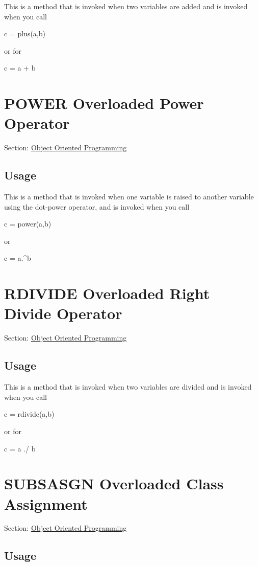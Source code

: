 This is a method that is invoked when two variables are added and is invoked when you call \begin{DoxyVerb}   c = plus(a,b)
\end{DoxyVerb}
 or for \begin{DoxyVerb}   c = a + b
\end{DoxyVerb}
 \hypertarget{class_power}{}\section{P\-O\-W\-E\-R Overloaded Power Operator}\label{class_power}
Section\-: \hyperlink{sec_class}{Object Oriented Programming} \hypertarget{vtkwidgets_vtkxyplotwidget_Usage}{}\subsection{Usage}\label{vtkwidgets_vtkxyplotwidget_Usage}
This is a method that is invoked when one variable is raised to another variable using the dot-\/power operator, and is invoked when you call \begin{DoxyVerb}   c = power(a,b)
\end{DoxyVerb}
 or \begin{DoxyVerb}   c = a.^b
\end{DoxyVerb}
 \hypertarget{class_rdivide}{}\section{R\-D\-I\-V\-I\-D\-E Overloaded Right Divide Operator}\label{class_rdivide}
Section\-: \hyperlink{sec_class}{Object Oriented Programming} \hypertarget{vtkwidgets_vtkxyplotwidget_Usage}{}\subsection{Usage}\label{vtkwidgets_vtkxyplotwidget_Usage}
This is a method that is invoked when two variables are divided and is invoked when you call \begin{DoxyVerb}   c = rdivide(a,b)
\end{DoxyVerb}
 or for \begin{DoxyVerb}   c = a ./ b
\end{DoxyVerb}
 \hypertarget{class_subsasgn}{}\section{S\-U\-B\-S\-A\-S\-G\-N Overloaded Class Assignment}\label{class_subsasgn}
Section\-: \hyperlink{sec_class}{Object Oriented Programming} \hypertarget{vtkwidgets_vtkxyplotwidget_Usage}{}\subsection{Usage}\label{vtkwidgets_vtkxyplotwidget_Usage}
